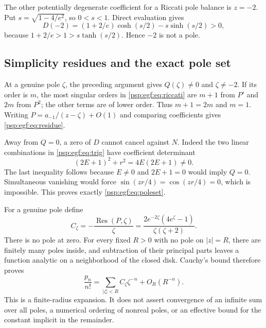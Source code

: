 \documentclass[11pt,letterpaper]{article}
\numberwithin{equation}{section}
\theoremstyle{remark}\newtheorem{remark}[theorem]{Remark}
\newcommand{\Res}{\operatorname{Res}}
\begin{document}
The other potentially degenerate coefficient for a Riccati pole balance
is $z=-2$. Put $s=\sqrt{1-4/e^2}$, so $0<s<1$. Direct evaluation gives
\[
 D(-2)=(1+2/e)\cosh(s/2)-s\sinh(s/2)>0,
\]
because $1+2/e>1>s\tanh(s/2)$. Hence $-2$ is not a pole.

\subsection{Simplicity residues and the exact pole set}
At a genuine pole $\zeta$, the preceding argument gives
$Q(\zeta)\ne0$ and $\zeta\ne-2$. If its order is $m$, the most singular
orders in \eqref{psp:egf:eq:riccati} are $m+1$ from $P'$ and $2m$ from $P^2$;
the other terms are of lower order. Thus $m+1=2m$ and $m=1$.
Writing $P=a_{-1}/(z-\zeta)+O(1)$ and comparing coefficients gives
\eqref{psp:egf:eq:residue}.

Away from $Q=0$, a zero of $D$ cannot cancel against $N$. Indeed the two
linear combinations in \eqref{psp:egf:eq:trig} have coefficient determinant
\[
 (2E+1)^2+r^2=4E(2E+1)\ne0.
\]
The last inequality follows because $E\ne0$ and $2E+1=0$ would imply
$Q=0$. Simultaneous vanishing would force $\sin(zr/4)=\cos(zr/4)=0$,
which is impossible. This proves exactly \eqref{psp:egf:eq:poleset}.

For a genuine pole define
\begin{equation}\label{psp:egf:eq:Czeta}
 C_\zeta=-\frac{\Res(P,\zeta)}\zeta
 =\frac{2e^{-2\zeta}(4e^\zeta-1)}{\zeta(\zeta+2)}.
\end{equation}
There is no pole at zero. For every fixed $R>0$ with no pole on
$|z|=R$, there are finitely many poles inside, and subtraction of their
principal parts leaves a function analytic on a neighborhood of the
closed disk. Cauchy's bound therefore proves
\begin{equation}\label{psp:egf:eq:finitepole}
 \frac{p_n}{n!}=\sum_{|\zeta|<R}C_\zeta\zeta^{-n}+O_R(R^{-n}).
\end{equation}
This is a finite-radius expansion. It does not assert convergence of an
infinite sum over all poles, a numerical ordering of nonreal poles, or an
effective bound for the constant implicit in the remainder.
\end{document}
